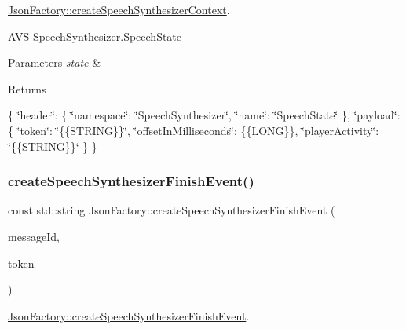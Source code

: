 \hyperlink{classAVSJson_1_1JsonFactory_ab83af75c1e25cf954843b823c9eefa93}{Json\+Factory\+::create\+Speech\+Synthesizer\+Context}. 

A\+VS Speech\+Synthesizer.\+Speech\+State 
\begin{DoxyParams}{Parameters}
{\em state} & \\
\hline
\end{DoxyParams}
\begin{DoxyReturn}{Returns}

\end{DoxyReturn}
\{ \char`\"{}header\char`\"{}\+: \{ \char`\"{}namespace\char`\"{}\+: \char`\"{}\+Speech\+Synthesizer\char`\"{}, \char`\"{}name\char`\"{}\+: \char`\"{}\+Speech\+State\char`\"{} \}, \char`\"{}payload\char`\"{}\+: \{ \char`\"{}token\char`\"{}\+: \char`\"{}\{\{\+S\+T\+R\+I\+N\+G\}\}\char`\"{}, \char`\"{}offset\+In\+Milliseconds\char`\"{}\+: \{\{L\+O\+NG\}\}, \char`\"{}player\+Activity\char`\"{}\+: \char`\"{}\{\{\+S\+T\+R\+I\+N\+G\}\}\char`\"{} \} \} \mbox{\label{classAVSJson_1_1JsonFactory_a7eaa5203dd954ce2f2d60e3a7f3b0fb5}} 
\subsubsection{\texorpdfstring{create\+Speech\+Synthesizer\+Finish\+Event()}{createSpeechSynthesizerFinishEvent()}}
{\footnotesize\ttfamily const std\+::string Json\+Factory\+::create\+Speech\+Synthesizer\+Finish\+Event (\begin{DoxyParamCaption}\item[{const std\+::string \&}]{message\+Id,  }\item[{const std\+::string \&}]{token }\end{DoxyParamCaption})}



\hyperlink{classAVSJson_1_1JsonFactory_a7eaa5203dd954ce2f2d60e3a7f3b0fb5}{Json\+Factory\+::create\+Speech\+Synthesizer\+Finish\+Event}. 

